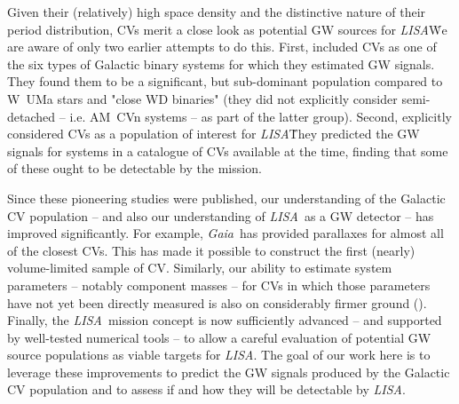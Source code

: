 \documentclass[fleqn,usenatbib]{mnras}
\newcommand{\lisa}{{\it LISA}}
\newcommand{\gaia}{{\it Gaia}}
\begin{document}
Given their (relatively) high space density and the distinctive nature of their period distribution, CVs merit a close look as potential GW sources for \lisa\. We are aware of only two earlier attempts to do this. First, \cite{HBW90} included CVs as one of the six types of Galactic binary systems for which they estimated GW signals. They found them to be a significant, but sub-dominant population compared to W~UMa stars and "close WD binaries" (they did not explicitly consider semi-detached -- i.e. AM~CVn systems -- as part of the latter group). Second, \cite{MAA00} explicitly considered CVs as a population of interest for \lisa\. They predicted the GW signals for systems in a catalogue of CVs available at the time, finding that some of these ought to be detectable by the mission. 

Since these pioneering studies were published, our understanding of the Galactic CV population -- and also our understanding of \lisa\ as a GW detector -- has improved significantly. For example, \gaia\ has provided parallaxes for almost all of the closest CVs. This has made it possible to construct the first (nearly) volume-limited sample of CV. Similarly, our ability to estimate system parameters -- notably component masses -- for CVs in which those parameters have not yet been directly measured is also on considerably firmer ground (\citealt{knigge06,knigge11,savoury11,carter13}). Finally, the \lisa\ mission concept is now sufficiently advanced -- and supported by well-tested numerical tools -- to allow a careful evaluation of potential GW source populations as viable targets for \lisa. The goal of our work here is to leverage these improvements to predict the GW signals produced by the Galactic CV population and to assess if and how they will be detectable by \lisa.

\end{document}
